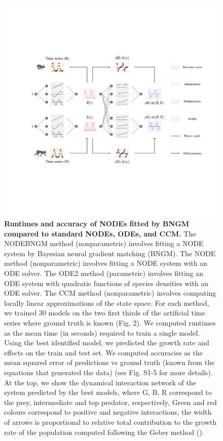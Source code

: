 \documentclass[11pt, oneside]{article}
\begin{document}
\newpage
\begin{figure}[H]
\begin{center}
\includegraphics[width=\linewidth,page=4]{figures/main.pdf}
\caption{
    \textbf{Runtimes and accuracy of NODEs fitted by BNGM compared to standard NODEs, ODEs, and CCM.} 
    The NODEBNGM method (nonparametric) involves fitting a NODE system by Bayesian neural gradient matching (BNGM).
    The NODE method (nonparametric) involves fitting a NODE system with an ODE solver. 
    The ODE2 method (parametric) involves fitting an ODE system with quadratic functions of species densities with an ODE solver. 
    The CCM method (nonparametric) involves computing locally linear approximations of the state space. 
    For each method, we trained 30 models on the two first thirds of the artificial time series where ground truth is known (Fig. 2). 
    We computed runtimes as the mean time (in seconds) required to train a single model. 
    Using the best identified model, we predicted the growth rate and effects on the train and test set. 
    We computed accuracies as the mean squared error of predictions vs ground truth (known from the equations that generated the data) (see Fig. S1-5 for more details). 
    At the top, we show the dynamical interaction network of the system predicted by the best models, where G, B, R correspond to the prey, intermediate and top predator, respectively,
    Green and red colours correspond to positive and negative interactions, the width of arrows is proportional to relative total contribution to the growth rate of the population computed following the Geber method (\cite{Hairston2005,Bonnaffe2021a}).
}
\end{center}
\end{figure}
\newpage
\end{document}
